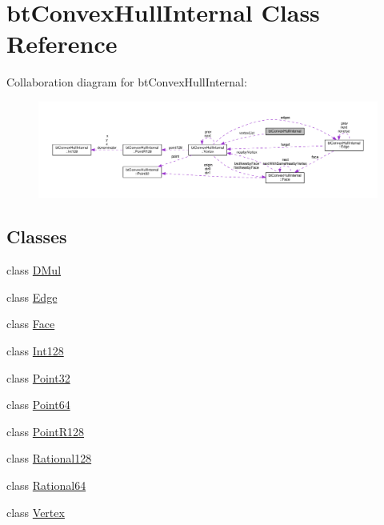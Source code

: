\hypertarget{classbtConvexHullInternal}{}\section{bt\+Convex\+Hull\+Internal Class Reference}
\label{classbtConvexHullInternal}


Collaboration diagram for bt\+Convex\+Hull\+Internal\+:
\nopagebreak
\begin{figure}[H]
\begin{center}
\leavevmode
\includegraphics[width=350pt]{classbtConvexHullInternal__coll__graph}
\end{center}
\end{figure}
\subsection*{Classes}
\begin{DoxyCompactItemize}
\item 
class \hyperlink{classbtConvexHullInternal_1_1DMul}{D\+Mul}
\item 
class \hyperlink{classbtConvexHullInternal_1_1Edge}{Edge}
\item 
class \hyperlink{classbtConvexHullInternal_1_1Face}{Face}
\item 
class \hyperlink{classbtConvexHullInternal_1_1Int128}{Int128}
\item 
class \hyperlink{classbtConvexHullInternal_1_1Point32}{Point32}
\item 
class \hyperlink{classbtConvexHullInternal_1_1Point64}{Point64}
\item 
class \hyperlink{classbtConvexHullInternal_1_1PointR128}{Point\+R128}
\item 
class \hyperlink{classbtConvexHullInternal_1_1Rational128}{Rational128}
\item 
class \hyperlink{classbtConvexHullInternal_1_1Rational64}{Rational64}
\item 
class \hyperlink{classbtConvexHullInternal_1_1Vertex}{Vertex}
\end{DoxyCompactItemize}
